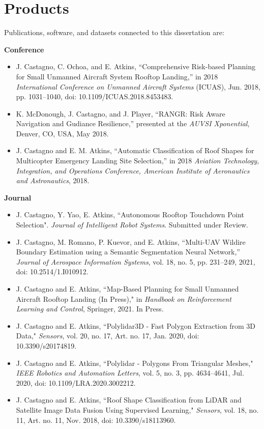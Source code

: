 \section{Products}

Publications, software, and datasets connected to this dissertation are:
\vspace{0.2cm}

\textbf{Conference}
\vspace{0.20cm}
\begin{itemize}[noitemsep]
    \item J. Castagno, C. Ochoa, and E. Atkins, ``Comprehensive Risk-based Planning for Small Unmanned Aircraft System Rooftop Landing,” in 2018 \emph{International Conference on Unmanned Aircraft Systems} (ICUAS), Jun. 2018, pp. 1031–1040, doi: 10.1109/ICUAS.2018.8453483.
    \item K. McDonough, J. Castagno, and J. Player, ``RANGR: Risk Aware Navigation and Gudiance Resilience,” presented at the \emph{AUVSI Xponential}, Denver, CO, USA, May 2018.
	\item J. Castagno and E. M. Atkins, ``Automatic Classification of Roof Shapes for Multicopter Emergency Landing Site Selection,” in 2018 \emph{Aviation Technology, Integration, and Operations Conference, American Institute of Aeronautics and Astronautics}, 2018.
\end{itemize}

\vspace{0.25cm}

\textbf{Journal}

\vspace{0.20cm}
\begin{itemize}[noitemsep]
    \item J. Castagno, Y. Yao, E. Atkins, ``Autonomous Rooftop Touchdown Point Selection". \emph{Journal of Intelligent Robot Systems}. Submitted under Review. 
    \item J. Castagno, M. Romano, P. Kuevor, and E. Atkins, ``Multi-UAV Wildire Boundary Estimation using a Semantic Segmentation Neural Network,” \emph{Journal of Aerospace Information Systems}, vol. 18, no. 5, pp. 231–249, 2021, doi: 10.2514/1.I010912.
    \item J. Castagno and E. Atkins, ``Map-Based Planning for Small Unmanned Aircraft Rooftop Landing (In Press)," in \emph{Handbook on Reinforcement Learning and Control}, Springer, 2021. In Press.
    \item J. Castagno and E. Atkins, “Polylidar3D - Fast Polygon Extraction from 3D Data," \emph{Sensors}, vol. 20, no. 17, Art. no. 17, Jan. 2020, doi: 10.3390/s20174819.
    \item J. Castagno and E. Atkins, “Polylidar - Polygons From Triangular Meshes," \emph{IEEE Robotics and Automation Letters}, vol. 5, no. 3, pp. 4634–4641, Jul. 2020, doi: 10.1109/LRA.2020.3002212.
    \item J. Castagno and E. Atkins, “Roof Shape Classification from LiDAR and Satellite Image Data Fusion Using Supervised Learning," \emph{Sensors}, vol. 18, no. 11, Art. no. 11, Nov. 2018, doi: 10.3390/s18113960.
\end{itemize}

